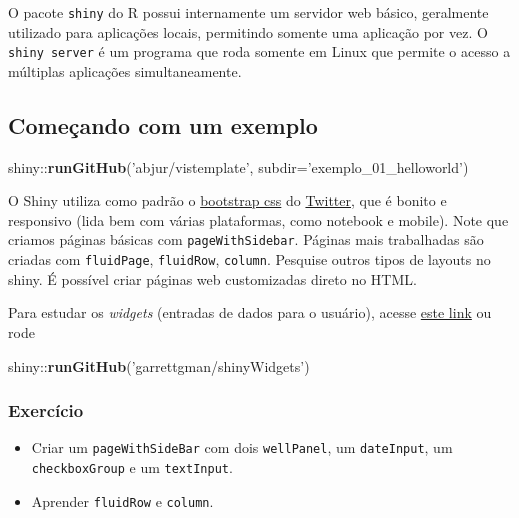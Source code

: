 \documentclass[]{book}
\newenvironment{Shaded}{\begin{snugshade}}{\end{snugshade}}
\newcommand{\KeywordTok}[1]{\textcolor[rgb]{0.13,0.29,0.53}{\textbf{{#1}}}}
\newcommand{\DataTypeTok}[1]{\textcolor[rgb]{0.13,0.29,0.53}{{#1}}}
\newcommand{\StringTok}[1]{\textcolor[rgb]{0.31,0.60,0.02}{{#1}}}
\newcommand{\NormalTok}[1]{{#1}}
\providecommand{\tightlist}{%
  \setlength{\itemsep}{0pt}\setlength{\parskip}{0pt}}
\begin{document}
O pacote \texttt{shiny} do R possui internamente um servidor web básico,
geralmente utilizado para aplicações locais, permitindo somente uma
aplicação por vez. O \texttt{shiny\ server} é um programa que roda
somente em Linux que permite o acesso a múltiplas aplicações
simultaneamente.

\subsection{Começando com um exemplo}\label{comecando-com-um-exemplo}

\begin{Shaded}
\begin{Highlighting}[]
\NormalTok{shiny::}\KeywordTok{runGitHub}\NormalTok{(}\StringTok{'abjur/vistemplate'}\NormalTok{, }\DataTypeTok{subdir=}\StringTok{'exemplo_01_helloworld'}\NormalTok{)}
\end{Highlighting}
\end{Shaded}

O Shiny utiliza como padrão o
\href{http://getbootstrap.com/css/}{bootstrap css} do
\href{https://twitter.com}{Twitter}, que é bonito e responsivo (lida bem
com várias plataformas, como notebook e mobile). Note que criamos
páginas básicas com \texttt{pageWithSidebar}. Páginas mais trabalhadas
são criadas com \texttt{fluidPage}, \texttt{fluidRow}, \texttt{column}.
Pesquise outros tipos de layouts no shiny. É possível criar páginas web
customizadas direto no HTML.

Para estudar os \emph{widgets} (entradas de dados para o usuário),
acesse \href{http://shiny.rstudio.com/gallery/widget-gallery.html}{este
link} ou rode

\begin{Shaded}
\begin{Highlighting}[]
\NormalTok{shiny::}\KeywordTok{runGitHub}\NormalTok{(}\StringTok{'garrettgman/shinyWidgets'}\NormalTok{)}
\end{Highlighting}
\end{Shaded}

\subsubsection{Exercício}\label{exercicio}

\begin{itemize}
\tightlist
\item
  Criar um \texttt{pageWithSideBar} com dois \texttt{wellPanel}, um
  \texttt{dateInput}, um \texttt{checkboxGroup} e um \texttt{textInput}.
\item
  Aprender \texttt{fluidRow} e \texttt{column}.
\end{itemize}
\end{document}
